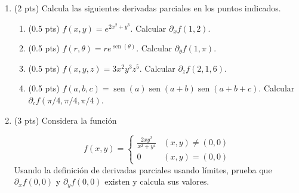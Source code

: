 \documentclass[12pt]{article}
\newcommand{\sen}{\operatorname{sen}}
\begin{document}
\bigskip

            
\bigskip
\bigskip
\bigskip


\begin{enumerate}

\item (2 pts) Calcula las siguientes derivadas parciales
  en los puntos indicados.

  \begin{enumerate}
  \item(0.5 pts) $f(x,y)=e^{2x^2+y^3}$. Calcular $\partial_xf(1,2)$.
  \item (0.5 pts) $f(r,\theta)=re^{\sen(\theta)}$.
      Calcular $\partial_\theta f(1,\pi)$.
    \item (0.5 pts) $f(x,y,z)=3x^{2}y^{3}z^{5}$. Calcular $\partial_zf(2,1,6)$.
    \item (0.5 pts) $f(a,b,c)=\sen(a)\sen(a+b)\sen(a+b+c)$.
      Calcular $\partial_cf(\pi/4,\pi/4, \pi/4)$.
    \end{enumerate}
    
    
  
\vspace{4cm}  
  
\item (3 pts) Considera la funci\'on

  \begin{equation*}
    f(x,y)=\left\{
      \begin{array}{cc}
        \frac{2xy^2}{x^2+y^4} & (x,y)\ne(0,0)\\
        0 & (x,y)=(0,0)
      \end{array}
    \right.
    \end{equation*}
    Usando la definici\'on de derivadas parciales usando l\'imites,
    prueba que $\partial_xf(0,0)$ y $\partial_yf(0,0)$ existen
    y calcula sus valores.



  \end{enumerate}


  
\end{document}
